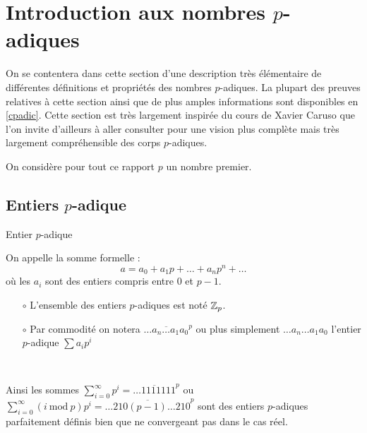 \section{Introduction aux nombres \texorpdfstring{$p$}{p}-adiques}
\label{padic}

On se contentera dans cette section d'une description très élémentaire de différentes définitions et propriétés des nombres $p$-adiques. La plupart des preuves relatives à cette section ainsi que de plus amples informations sont disponibles en \ref{cpadic}. Cette section est très largement inspirée du cours de Xavier Caruso \parencite{caruso_computations_2017} que l'on invite d'ailleurs à aller consulter pour une vision plus complète mais très largement compréhensible des corps $p$-adiques.

\begin{notation}
	On considère pour tout ce rapport $p$ un nombre premier.
\end{notation}

\subsection{Entiers \texorpdfstring{$p$}{p}-adique} 

\begin{definition}{Entier $p$-adique }

	On appelle  la somme formelle :
\[
	a  = a_0 + a_1 p + \ldots+a_{n}p^n+\ldots
\]
où les $a_i$ sont des entiers compris entre $0$ et $p-1$.

\end{definition}
\begin{remarques}
	\begin{itemize} \
		
		\item[$\circ$]  L'ensemble des entiers $p$-adiques est noté $ \mathbb {Z}_p $.
		\item[$\circ$] Par commodité on notera $\overline{\ldots a_n\ldots a_1 a_0}^p$ ou plus simplement $\ldots a_n \ldots a_1a_0$ l'entier $p$-adique $\sum a_{i}p^i$ 
\end{itemize}
\end{remarques}

\begin{ex} \

	Ainsi les sommes $\sum\limits_{i=0}^{ \infty} p^i = \overline{\ldots1111111}^p$ ou $\sum\limits_{i=0}^{ \infty} (i\ \text{mod}\ p) p^i =\overline{ \ldots210(p-1)\ldots210}^p $ sont des entiers $p$-adiques parfaitement définis bien que ne convergeant pas dans le cas réel.
\end{ex}

